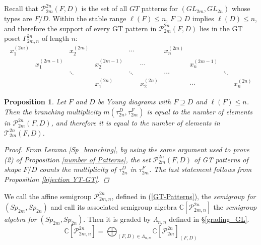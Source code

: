 \documentclass[11pt]{amsart}
\numberwithin{equation}{subsection}
\newtheorem{proposition}[theorem]{Proposition}
\begin{document}
\subsection{}
Recall that $\mathcal{P}_{2m}^{2n}(F,D)$ is the set of all $GT$ patterns for 
$({GL}_{2m},{GL}_{2n})$ whose types are $F/D$. Within the stable range 
$\ell(F)\leq n$, $F\supseteq D$ implies $\ell (D)\leq n$, and therefore the
support of every GT pattern in $\mathcal{P}_{2m}^{2n}(F,D)$ lies in the GT
poset $\Gamma _{2m,n}^{2n}$ of length $n$:
\begin{equation*}
\begin{array}{cccccccccc}
x_{1}^{(2m)} &  & x_{2}^{(2m)} &  & \cdots &  & x_{n}^{(2m)} &  &  &  \\ 
& x_{1}^{(2m-1)} &  & x_{2}^{(2m-1)} &  & \cdots &  & x_{n}^{(2m-1)} &  & \\ 
&  & \ddots &  & \ddots &  & \cdots &  & \ddots &  \\ 
&  &  & x_{1}^{(2n)} &  & x_{2}^{(2n)} &  & \cdots &  & x_{n}^{(2n)} \end{array}\end{equation*}

\begin{proposition}\label{Sp_counting}
Let $F$ and $D$ be Young diagrams with $F\supseteq D$ and 
$\ell (F)\leq n$. Then the branching multiplicity 
$m(\tau _{2n}^{D},\tau_{2m}^{F})$ is equal to the number of elements in 
$\mathcal{P}_{2m}^{2n}(F,D) $, and therefore it is equal to the number of elements 
in $\mathcal{T}_{2m}^{2n}(F,D)$.
\begin{proof}
From Lemma \ref{Sp_branching}, by using the same argument used to prove 
(2) of Proposition \ref{number of Patterns}, the set $\mathcal{P}_{2m}^{2n}(F,D)$ of 
GT patterns of shape $F/D$ counts the multiplicity of $\tau_{2n}^{D}$ in $\tau _{2m}^{F}$. 
The last statement follows from Proposition \ref{bijection YT-GT}.
\end{proof}
\end{proposition}

We call the affine semigroup $\mathcal{P}_{2m,n}^{2n}$, defined in 
(\ref{GT-Patterns}), the \textit{semigroup for} $({Sp}_{2m},{Sp}_{2n})$ and call
its associated semigroup algebra $\mathbb{C}[\mathcal{P}_{2m,n}^{2n}]$ the 
\textit{semigroup algebra for} $({Sp}_{2m},{Sp}_{2n})$. Then it is graded by 
$\Lambda _{n,n}$ defined in \S \ref{grading_GL}.
\begin{equation*}
\mathbb{C}[\mathcal{P}_{2m,n}^{2n}]=\bigoplus_{(F,D)\in \Lambda _{n,n}}
\mathbb{C}[\mathcal{P}_{2m}^{2n}]_{(F,D)}
\end{equation*}
\end{document}
